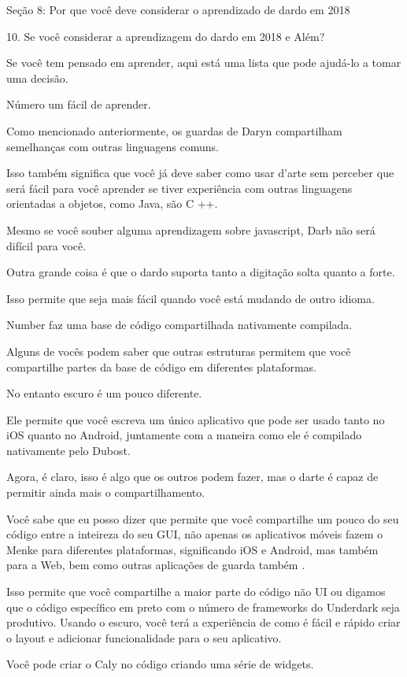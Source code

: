 Seção 8: Por que você deve considerar o aprendizado de dardo em
2018

10. Se você considerar a aprendizagem do dardo em 2018 e
Além?

Se você tem pensado em aprender, aqui está uma lista que pode ajudá-lo a tomar uma decisão.

Número um fácil de aprender.

Como mencionado anteriormente, os guardas de Daryn compartilham semelhanças com outras linguagens comuns.

Isso também significa que você já deve saber como usar d'arte sem perceber que será fácil para você aprender se tiver experiência com outras linguagens orientadas a objetos, como Java, são C ++.

Mesmo se você souber alguma aprendizagem sobre javascript, Darb não será difícil para você.

Outra grande coisa é que o dardo suporta tanto a digitação solta quanto a forte.

Isso permite que seja mais fácil quando você está mudando de outro idioma.

Number faz uma base de código compartilhada nativamente compilada.

Alguns de vocês podem saber que outras estruturas permitem que você compartilhe partes da base de código em diferentes plataformas.

No entanto escuro é um pouco diferente.

Ele permite que você escreva um único aplicativo que pode ser usado tanto no iOS quanto no Android, juntamente com a maneira como ele é compilado nativamente pelo Dubost.

Agora, é claro, isso é algo que os outros podem fazer, mas o darte é capaz de permitir ainda mais o compartilhamento.

Você sabe que eu posso dizer que permite que você compartilhe um pouco do seu código entre a inteireza do seu GUI, não apenas os aplicativos móveis fazem o Menke para diferentes plataformas, significando iOS e Android, mas também para a Web, bem como outras aplicações de guarda também .

Isso permite que você compartilhe a maior parte do código não UI ou digamos que o código específico em preto com o número de frameworks do Underdark seja produtivo. Usando o escuro, você terá a experiência de como é fácil e rápido criar o layout e adicionar funcionalidade para o seu aplicativo.

Você pode criar o Caly no código criando uma série de widgets.

